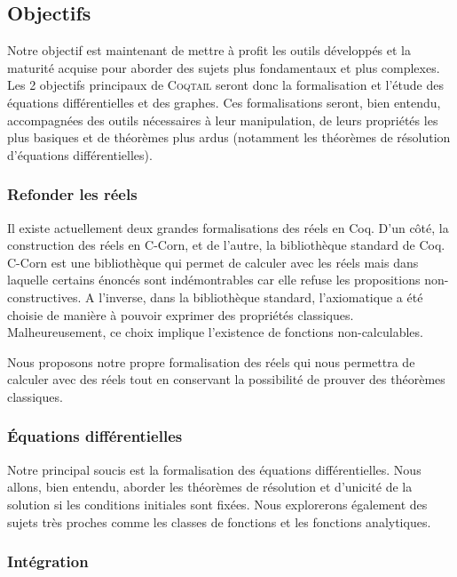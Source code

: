 \documentclass[11pt]{article}
\newcommand{\coqtail}{\textsc{Coqtail}}
\begin{document}
\subsection{Objectifs}

Notre objectif est maintenant de mettre à profit les outils développés et la maturité acquise pour aborder des sujets plus fondamentaux et plus complexes. Les 2 objectifs principaux de \coqtail{} seront donc la formalisation et l'étude des équations différentielles et des graphes. Ces formalisations seront, bien entendu, accompagnées des outils nécessaires à leur manipulation, de leurs propriétés les plus basiques et de théorèmes plus ardus (notamment les théorèmes de résolution d'équations différentielles).

\subsubsection{Refonder les réels}
Il existe actuellement deux grandes formalisations des réels en Coq. D'un côté, la construction des réels en C-Corn, et de l'autre, la bibliothèque standard de Coq. C-Corn est une bibliothèque qui permet de calculer avec les
réels mais dans laquelle certains énoncés sont indémontrables car elle refuse les propositions non-constructives. A l'inverse, dans la bibliothèque standard, l'axiomatique a été choisie de manière à pouvoir exprimer des propriétés classiques. Malheureusement, ce choix implique l'existence de fonctions non-calculables.

Nous proposons notre propre formalisation des réels qui nous permettra de calculer avec des réels tout en conservant la possibilité de prouver des théorèmes classiques.

\subsubsection{Équations différentielles}

Notre principal soucis est la formalisation des équations différentielles. Nous allons, bien entendu, aborder les théorèmes de résolution et d'unicité de la solution si les conditions initiales sont fixées. Nous explorerons également des sujets très proches comme les classes de fonctions et les fonctions analytiques.

\subsubsection{Intégration}
\end{document}
